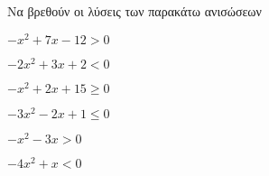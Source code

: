 Να βρεθούν οι λύσεις των παρακάτω ανισώσεων
\begin{multicols}{2}
\begin{alist}
\item $ -x^2+7x-12>0 $
\item $ -2x^2+3x+2<0 $
\item $ -x^2+2x+15\geq 0 $
\item $ -3x^2-2x+1\leq 0 $
\item $ -x^2-3x>0 $
\item $ -4x^2+x<0 $
\end{alist}
\end{multicols}
